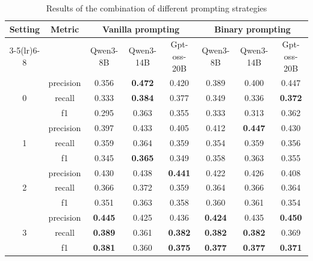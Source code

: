 \begin{table}[h]
  \centering
  \small
  \caption{Results of the combination of different prompting strategies}
  \label{tab:combination_results}
  \setlength{\tabcolsep}{4pt}
  \renewcommand{\arraystretch}{1.15}
  \begin{tabular}{c c c c c c c c}
    \toprule
    \multirow{2}{*}{Setting} & \multirow{2}{*}{Metric} & \multicolumn{3}{c}{Vanilla prompting} & \multicolumn{3}{c}{Binary prompting} \\
    \cmidrule(lr){3-5}\cmidrule(lr){6-8}
    & & Qwen3-8B & Qwen3-14B & Gpt-oss-20B & Qwen3-8B & Qwen3-14B & Gpt-oss-20B \\
    \midrule

    \multirow{3}{*}{0} 
    & precision & 0.356 & \textbf{0.472} & 0.420 & 0.389 & 0.400 & 0.447 \\
    & recall    & 0.333 & \textbf{0.384} & 0.377 & 0.349 & 0.336 & \textbf{0.372} \\
    & f1        & 0.295 & 0.363 & 0.355 & 0.333 & 0.313 & 0.362 \\
    \midrule

    \multirow{3}{*}{1} 
    & precision & 0.397 & 0.433 & 0.405 & 0.412 & \textbf{0.447} & 0.430 \\
    & recall    & 0.359 & 0.364 & 0.359 & 0.354 & 0.359 & 0.356 \\
    & f1        & 0.345 & \textbf{0.365} & 0.349 & 0.358 & 0.363 & 0.355 \\
    \midrule

    \multirow{3}{*}{2} 
    & precision & 0.430 & 0.438 & \textbf{0.441} & 0.422 & 0.426 & 0.408 \\
    & recall    & 0.366 & 0.372 & 0.359 & 0.364 & 0.366 & 0.364 \\
    & f1        & 0.351 & 0.363 & 0.358 & 0.360 & 0.361 & 0.354 \\
    \midrule

    \multirow{3}{*}{3} 
    & precision & \textbf{0.445} & 0.425 & 0.436 & \textbf{0.424} & 0.435 & \textbf{0.450} \\
    & recall    & \textbf{0.389} & 0.361 & \textbf{0.382} & \textbf{0.382} & \textbf{0.382} & 0.369 \\
    & f1        & \textbf{0.381} & 0.360 & \textbf{0.375} & \textbf{0.377} & \textbf{0.377} & \textbf{0.371} \\
    \bottomrule
  \end{tabular}
\end{table}